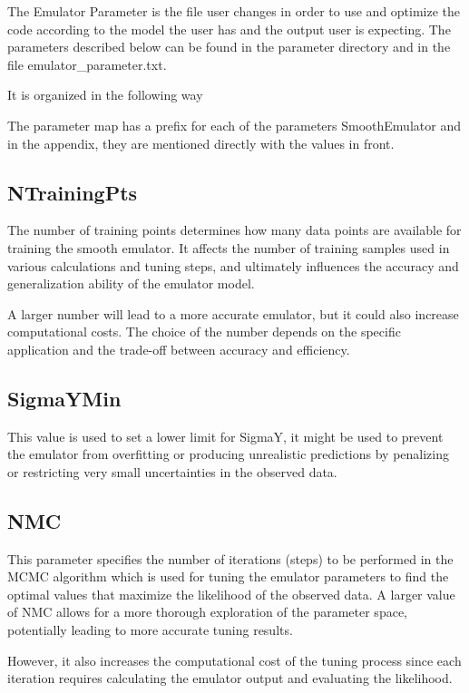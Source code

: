 \documentclass[12pt]{article}
\numberwithin{equation}{section}
\numberwithin{figure}{section}
\begin{document}
The Emulator Parameter is the file user changes in order to use and optimize the code according to the model the user has and the output user is expecting. The parameters described below can be found in the parameter directory and in the file emulator\_parameter.txt.

It is organized in the following way

The parameter map has a prefix for each of the parameters SmoothEmulator and in the appendix, they are mentioned directly with the values in front. 

\subsection{NTrainingPts}
The number of training points determines how many data points are available for training the smooth emulator. It affects the number of training samples used in various calculations and tuning steps, and ultimately influences the accuracy and generalization ability of the emulator model. 

A larger number will lead to a more accurate emulator, but it could also increase computational costs. The choice of the number depends on the specific application and the trade-off between accuracy and efficiency.


\subsection{SigmaYMin}
 
This value is used to set a lower limit for SigmaY, it might be used to prevent the emulator from overfitting or producing unrealistic predictions by penalizing or restricting very small uncertainties in the observed data. 



\subsection{NMC}

This parameter specifies the number of iterations (steps) to be performed in the MCMC algorithm which is used for tuning the emulator parameters to find the optimal values that maximize the likelihood of the observed data. A larger value of NMC allows for a more thorough exploration of the parameter space, potentially leading to more accurate tuning results.

However, it also increases the computational cost of the tuning process since each iteration requires calculating the emulator output and evaluating the likelihood.
\end{document}

